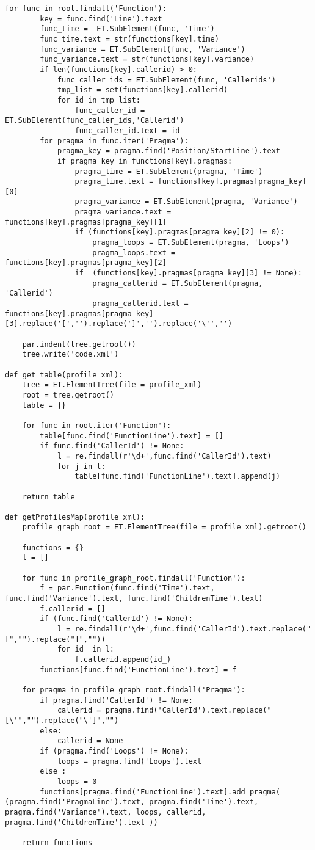 \documentclass[a4paper,11pt,twoside]{book}
\begin{document}
\begin{lstlisting}[language=CCC, caption=profiler.py]
	for func in root.findall('Function'):
		key = func.find('Line').text
		func_time =  ET.SubElement(func, 'Time')
		func_time.text = str(functions[key].time)
		func_variance = ET.SubElement(func, 'Variance')
		func_variance.text = str(functions[key].variance)
		if len(functions[key].callerid) > 0:
			func_caller_ids = ET.SubElement(func, 'Callerids')
			tmp_list = set(functions[key].callerid)
			for id in tmp_list:
				func_caller_id = ET.SubElement(func_caller_ids,'Callerid')
				func_caller_id.text = id
		for pragma in func.iter('Pragma'):
			pragma_key = pragma.find('Position/StartLine').text
			if pragma_key in functions[key].pragmas:
				pragma_time = ET.SubElement(pragma, 'Time')
				pragma_time.text = functions[key].pragmas[pragma_key][0]
				pragma_variance = ET.SubElement(pragma, 'Variance')
				pragma_variance.text = functions[key].pragmas[pragma_key][1]
				if (functions[key].pragmas[pragma_key][2] != 0):
					pragma_loops = ET.SubElement(pragma, 'Loops')
					pragma_loops.text = functions[key].pragmas[pragma_key][2]	
				if 	(functions[key].pragmas[pragma_key][3] != None):
					pragma_callerid = ET.SubElement(pragma, 'Callerid')
					pragma_callerid.text = functions[key].pragmas[pragma_key][3].replace('[','').replace(']','').replace('\'','')

	par.indent(tree.getroot())			
	tree.write('code.xml')

def get_table(profile_xml):
	tree = ET.ElementTree(file = profile_xml) 
	root = tree.getroot()
	table = {}

	for func in root.iter('Function'):
		table[func.find('FunctionLine').text] = []
		if func.find('CallerId') != None:
			l = re.findall(r'\d+',func.find('CallerId').text)
			for j in l:
				table[func.find('FunctionLine').text].append(j)

	return table

def getProfilesMap(profile_xml):
	profile_graph_root = ET.ElementTree(file = profile_xml).getroot()

	functions = {}
	l = []

	for func in profile_graph_root.findall('Function'):
		f = par.Function(func.find('Time').text, func.find('Variance').text, func.find('ChildrenTime').text)
		f.callerid = []
		if (func.find('CallerId') != None):
			l = re.findall(r'\d+',func.find('CallerId').text.replace("[","").replace("]",""))
			for id_ in l:
				f.callerid.append(id_)
		functions[func.find('FunctionLine').text] = f

	for pragma in profile_graph_root.findall('Pragma'):
		if pragma.find('CallerId') != None:
			callerid = pragma.find('CallerId').text.replace("[\'","").replace("\']","")
		else:
			callerid = None
		if (pragma.find('Loops') != None):
			loops = pragma.find('Loops').text
		else :
			loops = 0
		functions[pragma.find('FunctionLine').text].add_pragma( (pragma.find('PragmaLine').text, pragma.find('Time').text, pragma.find('Variance').text, loops, callerid, pragma.find('ChildrenTime').text ))

	return functions
\end{lstlisting}
\end{document}
